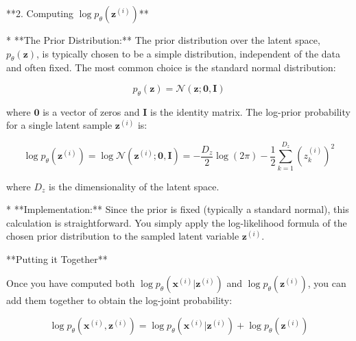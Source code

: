 \documentclass{article}
\begin{document}
**2. Computing $\log p_{\theta}(\mathbf{z}^{(i)})$**

*   **The Prior Distribution:**  The prior distribution over the latent space, $p_{\theta}(\mathbf{z})$, is typically chosen to be a simple distribution, independent of the data and often fixed. The most common choice is the standard normal distribution:

    \[
    p_{\theta}(\mathbf{z}) = \mathcal{N}(\mathbf{z} ; \mathbf{0}, \mathbf{I})
    \]

    where $\mathbf{0}$ is a vector of zeros and $\mathbf{I}$ is the identity matrix. The log-prior probability for a single latent sample $\mathbf{z}^{(i)}$ is:

    \[
    \log p_{\theta}(\mathbf{z}^{(i)}) = \log \mathcal{N}(\mathbf{z}^{(i)} ; \mathbf{0}, \mathbf{I}) = -\frac{D_z}{2} \log(2\pi) - \frac{1}{2} \sum_{k=1}^{D_z} (z_k^{(i)})^2
    \]

    where $D_z$ is the dimensionality of the latent space.

*   **Implementation:**  Since the prior is fixed (typically a standard normal), this calculation is straightforward. You simply apply the log-likelihood formula of the chosen prior distribution to the sampled latent variable $\mathbf{z}^{(i)}$.

**Putting it Together**

Once you have computed both $\log p_{\theta}(\mathbf{x}^{(i)} | \mathbf{z}^{(i)})$ and $\log p_{\theta}(\mathbf{z}^{(i)})$, you can add them together to obtain the log-joint probability:

\[
\log p_{\theta}(\mathbf{x}^{(i)}, \mathbf{z}^{(i)}) = \log p_{\theta}(\mathbf{x}^{(i)} | \mathbf{z}^{(i)}) + \log p_{\theta}(\mathbf{z}^{(i)})
\]
\end{document}
